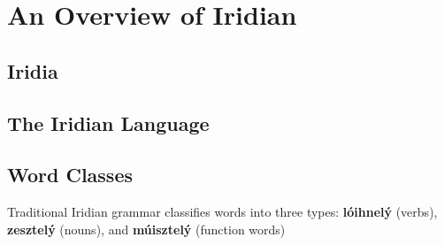 \chapter{An Overview of Iridian}

\section{Iridia}

\section{The Iridian Language}


\section{Word Classes}\label{sec:wordclasses}
Traditional Iridian grammar classifies words into three types: \textbf{lóihnelý} (verbs), \textbf{zesztelý} (nouns), and \textbf{múisztelý} (function words)
